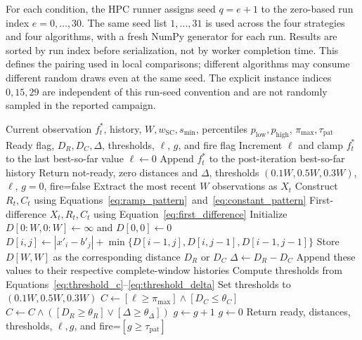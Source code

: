 \documentclass[mathematics,article,accept,moreauthors]{Definitions/mdpi}
\begin{document}
For each condition, the HPC runner assigns seed $q=e+1$ to the zero-based run
index $e=0,\ldots,30$. The same seed list $1,\ldots,31$ is used across the
four strategies and four algorithms, with a fresh NumPy generator for each
run. Results are sorted by run index before serialization, not by worker
completion time. This defines the pairing used in local comparisons;
different algorithms may consume different random draws even at the same
seed. The explicit instance indices $0,15,29$ are independent of this
run-seed convention and are not randomly sampled in the reported campaign.

\begin{algorithm}[H]
\caption{\hl{Monitor} %
 update: derivatives, thresholds, and temporal confirmation.}
\label{alg:monitor}
\footnotesize
\begin{algorithmic}[1]
\Require Current observation $f_t^*$, history, $W,w_{\mathrm{SC}},s_{\min}$,
percentiles $p_{\mathrm{low}},p_{\mathrm{high}}$, $\pi_{\max},\tau_{\mathrm{pat}}$
\Ensure Ready flag, $D_R,D_C,\Delta$, thresholds, $\ell$, $g$, and fire flag
  \State Increment $\ell$ and clamp $f_t^*$ to the last best-so-far value
\Else
  \State $\ell\gets0$
\EndIf
\State Append $f_t^*$ to the post-iteration best-so-far history
  \State Return not-ready, zero distances and $\Delta$, thresholds
  $(0.1W,0.5W,0.3W)$, $\ell$, $g=0$, fire=false
\EndIf
\State Extract the most recent $W$ observations as $X_t$
\State Construct $R_t,C_t$ using Equations~\eqref{eq:ramp_pattern}~and~\eqref{eq:constant_pattern}
\State First-difference $X_t,R_t,C_t$ using Equation~\eqref{eq:first_difference}
  \State Initialize $D[0{:}W,0{:}W]\gets\infty$ and $D[0,0]\gets0$
      \State $D[i,j]\gets|x'_i-b'_j|+\min\{D[i-1,j],D[i,j-1],D[i-1,j-1]\}$
    \EndFor
  \EndFor
  \State Store $D[W,W]$ as the corresponding distance $D_R$ or $D_C$
\EndFor
\State $\Delta\gets D_R-D_C$
\State Append these values to their respective complete-window histories
  \State Compute thresholds from Equations~\eqref{eq:threshold_c}--\eqref{eq:threshold_delta}
\Else
  \State Set thresholds to $(0.1W,0.5W,0.3W)$
\EndIf
\State $C\gets[\ell\geq\pi_{\max}]\land[D_C\leq\theta_C]$
\State $C\gets C\land([D_R\geq\theta_R]\lor[\Delta\geq\theta_\Delta])$
  \State $g\gets g+1$
\Else
  \State $g\gets0$
\EndIf
\State Return ready, distances, thresholds, $\ell,g$, and fire=$[g\geq\tau_{\mathrm{pat}}]$
\end{algorithmic}
\end{algorithm}
\end{document}
